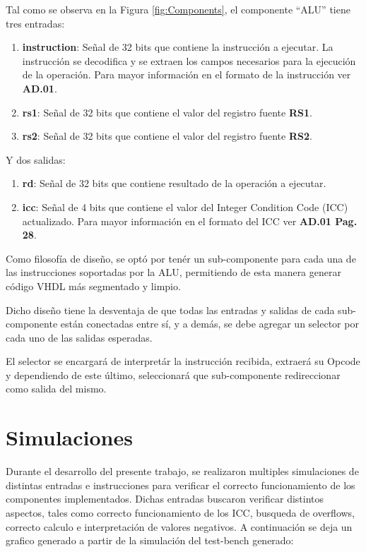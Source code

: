 \documentclass[
  11pt, %
  codirector, %
]{charter}
\begin{document}
\vspace{25px}

Tal como se observa en la Figura \ref{fig:Components}, el componente ``ALU''
tiene tres entradas:

\begin{enumerate}
\item \textbf{instruction}: Señal de 32 bits que contiene la instrucción a
  ejecutar. La instrucción se decodifica y se extraen los campos necesarios para
  la ejecución de la operación. Para mayor información en el formato de la
  instrucción ver \textbf{AD.01}.
\item \textbf{rs1}: Señal de 32 bits que contiene el valor del registro fuente
  \textbf{RS1}.
\item \textbf{rs2}: Señal de 32 bits que contiene el valor del registro fuente
  \textbf{RS2}.
\end{enumerate}

Y dos salidas:

\begin{enumerate}
\item \textbf{rd}: Señal de 32 bits que contiene resultado de la operación a ejecutar.
\item \textbf{icc}: Señal de 4 bits que contiene el valor del Integer Condition
  Code (ICC) actualizado. Para mayor información en el formato del ICC ver
  \textbf{AD.01 Pag. 28}.
\end{enumerate}

Como filosofía de diseño, se optó por tenér un sub-componente para cada una de
las instrucciones soportadas por la ALU, permitiendo de esta manera generar
código VHDL más segmentado y limpio.

Dicho diseño tiene la desventaja de que todas las entradas y salidas de cada
sub-componente están conectadas entre sí, y a demás, se debe agregar un selector
por cada uno de las salidas esperadas.

El selector se encargará de interpretár la instrucción recibida, extraerá su
Opcode y dependiendo de este último, seleccionará que sub-componente
redireccionar como salida del mismo.

\section{Simulaciones}
\label{sec:org0000000}

Durante el desarrollo del presente trabajo, se realizaron multiples simulaciones de distintas entradas e instrucciones para verificar el correcto funcionamiento de los componentes implementados. Dichas entradas buscaron verificar distintos aspectos, tales como correcto funcionamiento de los ICC, busqueda de overflows, correcto calculo e interpretación de valores negativos. A continuación se deja un grafico generado a partir de la simulación del test-bench generado:
\end{document}
